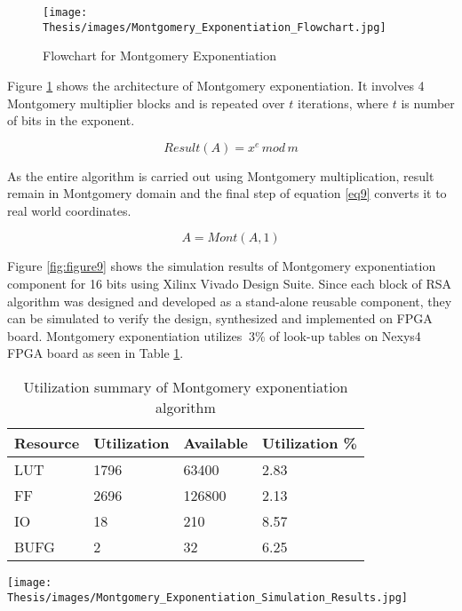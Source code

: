 \documentclass{cpp}
\begin{document}
\begin{figure}[htp]
    \centering
    \texttt{[image: Thesis/images/Montgomery\_Exponentiation\_Flowchart.jpg]}
    \caption{Flowchart for Montgomery Exponentiation}
    \label{fig:figure8}
\end{figure}

Figure \ref{fig:figure8} shows the architecture of Montgomery exponentiation. It involves 4 Montgomery multiplier blocks and is repeated over $t$ iterations, where $t$ is number of bits in the exponent.

\begin{equation}
\label{eq8}
Result (A) = x^e\,mod\,m
\end{equation}

As the entire algorithm is carried out using Montgomery multiplication, result remain in Montgomery domain and the final step of equation \eqref{eq9} converts it to real world coordinates.

\begin{equation}
\label{eq9}
A = Mont(A, 1)
\end{equation}

Figure \ref{fig:figure9} shows the simulation results of Montgomery exponentiation component for 16 bits using Xilinx Vivado Design Suite. Since each block of RSA algorithm was designed and developed as a stand-alone reusable component, they can be simulated to verify the design, synthesized and implemented on FPGA board. Montgomery exponentiation utilizes $~3\%$ of look-up tables on Nexys4 FPGA board as seen in Table \ref{table:table2}.

\begin{table}[h]
\centering
\caption{Utilization summary of Montgomery exponentiation algorithm}
\begin{tabular}{llll}
\hline
Resource &
Utilization &
Available &
Utilization \% \\
\hline
LUT &
1796 &
63400 &
2.83 \\
FF &
2696 &
126800 &
2.13 \\
IO &
18 &
210 &
8.57 \\
BUFG &
2 &
32 &
6.25 \\
\hline
\end{tabular}
\label{table:table2}
\end{table}

\begin{figure*}[htp]
    \centering
    \texttt{[image: Thesis/images/Montgomery\_Exponentiation\_Simulation\_Results.jpg]}
    \caption{Simulation results of Montgomery exponentiation}
    \label{fig:figure9}
\end{figure*}
\end{document}
